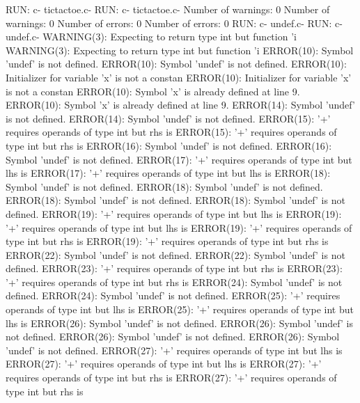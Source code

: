 \documentclass[12pt]{book}
\begin{document}
RUN: c- tictactoe.c-                                                RUN: c- tictactoe.c-
Number of warnings: 0                                                Number of warnings: 0
Number of errors: 0                                                Number of errors: 0
RUN: c- undef.c-                                                RUN: c- undef.c-
WARNING(3): Expecting to return type int but function 'i        WARNING(3): Expecting to return type int but function 'i
ERROR(10): Symbol 'undef' is not defined.                        ERROR(10): Symbol 'undef' is not defined.
ERROR(10): Initializer for variable 'x' is not a constan        ERROR(10): Initializer for variable 'x' is not a constan
ERROR(10): Symbol 'x' is already defined at line 9.                ERROR(10): Symbol 'x' is already defined at line 9.
ERROR(14): Symbol 'undef' is not defined.                        ERROR(14): Symbol 'undef' is not defined.
ERROR(15): '+' requires operands of type int but rhs is         ERROR(15): '+' requires operands of type int but rhs is 
ERROR(16): Symbol 'undef' is not defined.                        ERROR(16): Symbol 'undef' is not defined.
ERROR(17): '+' requires operands of type int but lhs is         ERROR(17): '+' requires operands of type int but lhs is 
ERROR(18): Symbol 'undef' is not defined.                        ERROR(18): Symbol 'undef' is not defined.
ERROR(18): Symbol 'undef' is not defined.                        ERROR(18): Symbol 'undef' is not defined.
ERROR(19): '+' requires operands of type int but lhs is         ERROR(19): '+' requires operands of type int but lhs is 
ERROR(19): '+' requires operands of type int but rhs is         ERROR(19): '+' requires operands of type int but rhs is 
ERROR(22): Symbol 'undef' is not defined.                        ERROR(22): Symbol 'undef' is not defined.
ERROR(23): '+' requires operands of type int but rhs is         ERROR(23): '+' requires operands of type int but rhs is 
ERROR(24): Symbol 'undef' is not defined.                        ERROR(24): Symbol 'undef' is not defined.
ERROR(25): '+' requires operands of type int but lhs is         ERROR(25): '+' requires operands of type int but lhs is 
ERROR(26): Symbol 'undef' is not defined.                        ERROR(26): Symbol 'undef' is not defined.
ERROR(26): Symbol 'undef' is not defined.                        ERROR(26): Symbol 'undef' is not defined.
ERROR(27): '+' requires operands of type int but lhs is         ERROR(27): '+' requires operands of type int but lhs is 
ERROR(27): '+' requires operands of type int but rhs is         ERROR(27): '+' requires operands of type int but rhs is 
\end{document}
